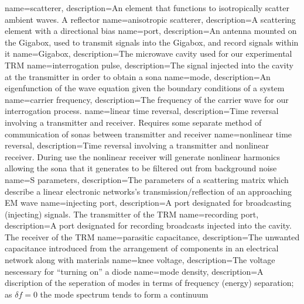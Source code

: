{
   name=scatterer,
  description={An element that functions to isotropically scatter ambient waves. A reflector}
}
{
   name=anisotropic scatterer,
  description={A scattering element with a directional bias}
}
{
   name=port,
  description={An antenna mounted on the Gigabox, used to transmit signals into the Gigabox, and record signals within it}
}
{
   name=Gigabox,
  description={The microwave cavity used for our experimental TRM}
}
{
   name=interrogation pulse,
  description={The signal injected into the cavity at the transmitter in order to obtain a sona}
}
{
   name=mode,
  description={An eigenfunction of the wave equation given the boundary conditions of a system}
}
{
   name=carrier frequency,
  description={The frequency of the carrier wave for our interrogation process.}
}
{
   name=linear time reversal,
  description={Time reversal involving a transmitter and receiver.  Requires some separate method of communication of sonas between transmitter and receiver}
}
{
   name=nonlinear time reversal,
  description={Time reversal involving a transmitter and nonlinear receiver.  During use the nonlinear receiver will generate nonlinear harmonics allowing the sona that it generates to be filtered out from background noise}
}
{
   name=S parameters,
  description={The parameters of a scattering matrix which describe a linear electronic networks's transmission/reflection of an approaching EM wave}
}
{
   name=injecting port,
  description={A port designated for broadcasting (injecting) signals. The transmitter of the TRM}
}
{
   name=recording port,
  description={A port designated for recording broadcasts injected into the cavity. The receiver of the TRM}
}
{
   name=parasitic capacitance,
  description={The unwanted capacitance introduced from the arrangement of components in an electrical network along with materials}
}
{
   name=knee voltage,
  description={The voltage nescessary for ``turning on'' a diode}
}
{
   name=mode density,
  description={A discription of the seperation of modes in terms of frequency (energy) separation; as $\delta f = 0$ the mode spectrum tends to form a continuum}
}
